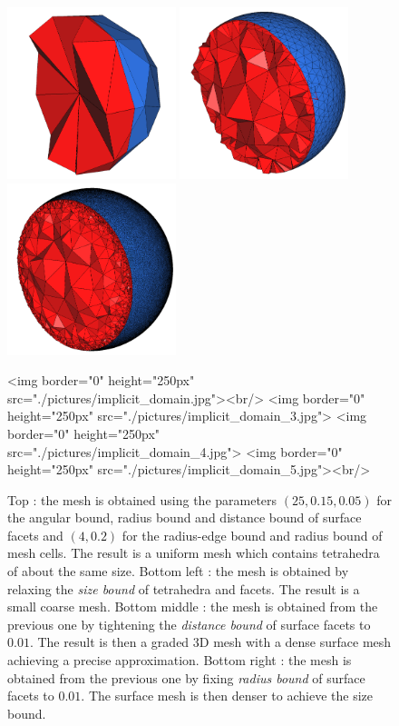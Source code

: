 \begin{figure}[ht]
\begin{center}
\begin{ccTexOnly}
   \includegraphics[height=5cm]{Mesh_3/pictures/implicit_domain_3}
   \includegraphics[height=5cm]{Mesh_3/pictures/implicit_domain_4}
   \includegraphics[height=5cm]{Mesh_3/pictures/implicit_domain_5}
 \end{ccTexOnly}
 \begin{ccHtmlOnly}
   <img border="0" height="250px" src="./pictures/implicit_domain.jpg"><br/>
   <img border="0" height="250px" src="./pictures/implicit_domain_3.jpg">
   <img border="0" height="250px" src="./pictures/implicit_domain_4.jpg">
   <img border="0" height="250px" src="./pictures/implicit_domain_5.jpg"><br/>
 \end{ccHtmlOnly}
 \caption{Top : the mesh  is obtained using the parameters $(25,0.15,0.05)$ for the angular bound,
radius bound and distance bound of  surface facets
and 
$(4,0.2)$ for  the radius-edge bound and radius  bound of mesh cells. The result is a  uniform mesh which contains tetrahedra
of about the same size. 
Bottom  left :
the mesh  is obtained by relaxing the \emph{ size bound} of tetrahedra
and facets.
 The result is a small coarse mesh. 
Bottom middle : the mesh  is obtained from the previous one  by tightening the \emph{distance bound} 
of surface facets to
$0.01$. The result is then a graded 3D mesh with a dense surface mesh
achieving a precise approximation. 
Bottom right :
the mesh  is obtained from the previous one  by fixing \emph{radius bound} of surface facets to $0.01$. The surface mesh is then denser to achieve the size bound.}
  \label{figure:parameters}
\end{center}
\end{figure}

